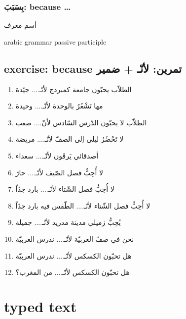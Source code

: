 \documentclass[a4paper]{article}
\begin{document}
\subsubsection{بِسَبَبَ: \textenglish{because \ldots}}


أسم معرف

arabic grammar passive participle


\subsection{\textenglish{exercise: because}  تمرين: لأنّـ + ضمير}
\begin{enumerate}
\item الطلاّب يحبّون جامعة كمبردج لأنّـ.... جيّدة
\item مها تَشْعُرُ بالوحدة لأنّـ.... وحيدة
\item الطلاّب لا يحبّون الدّرس السّادس لأنّ.... صعب
\item لا تَحْضُرُ ليلى إلى الصفّ لأنّـ.... مريضة
\item أصدقائي يَرقَون لأنّـ.... سعداء
\item لا أُحِبُّ فصل الصّيف لأنّـ.... حارّ
\item لا أُحِبُّ فصل الشّتاء لأنّـ.... بارد جدّاً
\item لا أُحِبُّ فصل الشّتاء لأنّـ.... الطّقس فيه بارد جدّاً
\item يُحِبُّ زميلي مدينة مدريد لأنّـ.... جميلة
\item نحن في صفّ العربيّة لأنّـ.... ندرس العربيّة
\item هل تحبّون الكسكس لأنّـ.... ندرس العربيّة
\item هل تحبّون الكسكس لأنّـ.... من المغرب؟
\end{enumerate}

\section{typed text}
\end{document}
